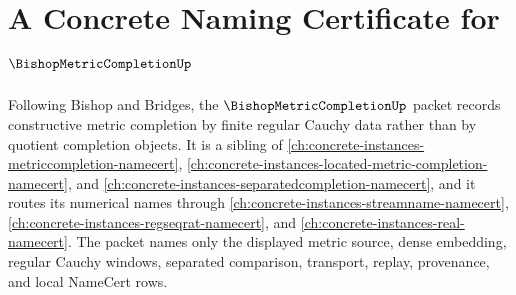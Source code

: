 \chapter{A Concrete Naming Certificate for $\BishopMetricCompletionUp$}
\label{ch:concrete-instances-bishop-metric-completion-namecert}

Following Bishop and Bridges, the $\BishopMetricCompletionUp$ packet records constructive metric completion by finite regular Cauchy data rather than by quotient completion objects. It is a sibling of \autoref{ch:concrete-instances-metriccompletion-namecert}, \autoref{ch:concrete-instances-located-metric-completion-namecert}, and \autoref{ch:concrete-instances-separatedcompletion-namecert}, and it routes its numerical names through \autoref{ch:concrete-instances-streamname-namecert}, \autoref{ch:concrete-instances-regseqrat-namecert}, and \autoref{ch:concrete-instances-real-namecert}. The packet names only the displayed metric source, dense embedding, regular Cauchy windows, separated comparison, transport, replay, provenance, and local NameCert rows.


